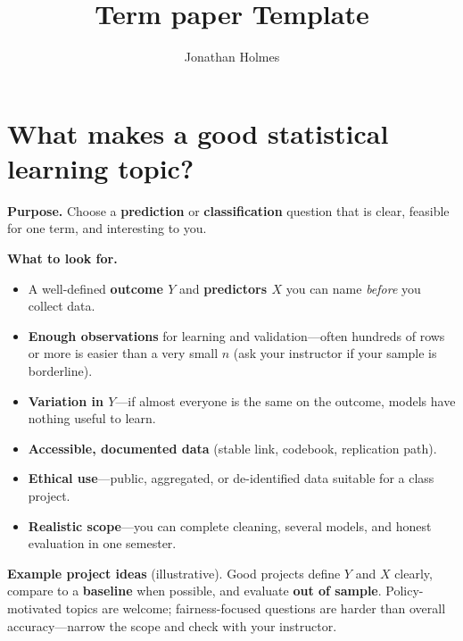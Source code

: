 \documentclass[11pt,letterpaper]{article}
\title{Term paper Template}
\author{Jonathan Holmes}
\date{}
\newcommand{\Purpose}[1]{\par\medskip\noindent\textbf{Purpose.} #1\par}
\newcommand{\guide}[1]{%
  \par\medskip\noindent\textbf{What to look for.}%
  \begin{itemize}#1\end{itemize}%
}
\begin{document}
\maketitle

\section*{What makes a good statistical learning topic?}

\Purpose{Choose a \textbf{prediction} or \textbf{classification} question that is clear, feasible for one term, and interesting to you.}

\guide{
  \item A well-defined \textbf{outcome $Y$} and \textbf{predictors $X$} you can name \emph{before} you collect data.
  \item \textbf{Enough observations} for learning and validation---often hundreds of rows or more is easier than a very small $n$ (ask your instructor if your sample is borderline).
  \item \textbf{Variation in $Y$}---if almost everyone is the same on the outcome, models have nothing useful to learn.
  \item \textbf{Accessible, documented data} (stable link, codebook, replication path).
  \item \textbf{Ethical use}---public, aggregated, or de-identified data suitable for a class project.
  \item \textbf{Realistic scope}---you can complete cleaning, several models, and honest evaluation in one semester.
}

\noindent\textbf{Example project ideas} (illustrative).
Good projects define $Y$ and $X$ clearly, compare to a \textbf{baseline} when possible, and evaluate \textbf{out of sample}.
Policy-motivated topics are welcome; fairness-focused questions are harder than overall accuracy---narrow the scope and check with your instructor.
\end{document}
